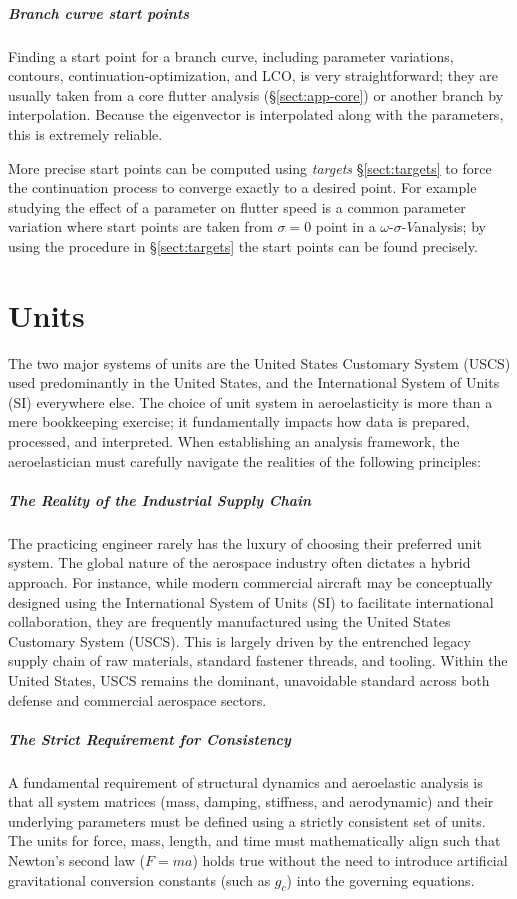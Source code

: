 \documentclass[10pt,openany,twoside]{book}
\numberwithin{equation}{section}   %
\newcommand{\Newterm}[1]{{\em #1}}
\newcommand{\Sectref}[1]{\S\ref{#1}}
\newcommand{\OSV}{$\omega$-$\sigma$-$V$\:}               %
\begin{document}
\subparagraph{Branch curve start points}\label{sect:pv-start}
Finding a start point for a branch curve, including parameter variations,
contours, continuation-optimization, and LCO,
is very straightforward; they are usually
taken from a core flutter analysis (\Sectref{sect:app-core}) or another
branch by interpolation. Because the eigenvector is interpolated
along with the parameters, this is extremely reliable.

More precise start points can be computed using \Newterm{targets}
\Sectref{sect:targets} to force the continuation process to converge
exactly to a desired point.  For example studying the effect of a parameter
on flutter speed is a common parameter variation where start points are
taken from $\sigma=0$ point in a \OSV analysis; by using the procedure in
\Sectref{sect:targets} the start points can be found precisely.


\section{Units}\label{sect:units}
The two major systems of units are the United States Customary System (USCS)
used predominantly in the United States,
and the International System of Units (SI) everywhere else.
The choice of unit system in aeroelasticity is more than a mere
bookkeeping exercise; it fundamentally impacts how data is prepared,
processed, and interpreted. When establishing an analysis framework,
the aeroelastician must carefully navigate the realities of the following
principles:

\subparagraph{The Reality of the Industrial Supply Chain} The practicing
engineer rarely has the luxury of choosing their preferred unit
system. The global nature of the aerospace industry often dictates a
hybrid approach. For instance, while modern commercial aircraft may be
conceptually designed using the International System of Units (SI) to
facilitate international collaboration, they are frequently manufactured
using the United States Customary System (USCS). This is largely
driven by the entrenched legacy supply chain of raw materials, standard
fastener threads, and tooling. Within the United States, USCS remains
the dominant, unavoidable standard across both defense and commercial
aerospace sectors.

\subparagraph{The Strict Requirement for Consistency}
A fundamental requirement of structural dynamics and aeroelastic
analysis is that all system matrices (mass, damping, stiffness, and
aerodynamic) and their underlying parameters must be defined using a
strictly consistent set of units. The units for force, mass, length,
and time must mathematically align such that Newton's second law ($F =
ma$) holds true without the need to introduce artificial gravitational
conversion constants (such as $g_c$) into the governing equations.
\end{document}
